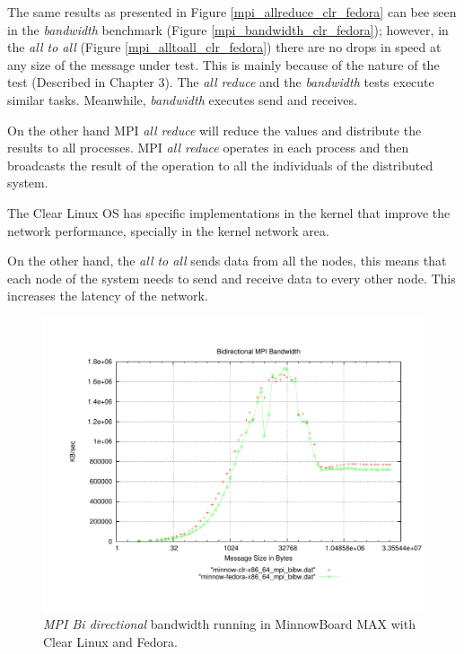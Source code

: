 The same results as presented in Figure \ref{mpi_allreduce_clr_fedora} can bee
seen in the \textit{bandwidth} benchmark (Figure
\ref{mpi_bandwidth_clr_fedora}); however, in the \textit{all to all} (Figure
\ref{mpi_alltoall_clr_fedora}) there are no drops in speed at any size of the
message under test.  This is mainly because of the nature of the test
(Described in Chapter 3). The \textit{all reduce} and the \textit{bandwidth}
tests execute similar tasks. Meanwhile, \textit{bandwidth} executes send and
receives.

On the other hand MPI \textit{all reduce} will reduce the values and distribute
the results to all processes. MPI \textit{all reduce} operates in each process
and then broadcasts the result of the operation to all the individuals of the
distributed system.

The Clear Linux OS has specific implementations in the kernel that improve the
network performance, specially in the kernel network area.

On the other hand, the \textit{all to all} sends data from all the nodes, this
means that each node of the system needs to send and receive data to every
other node. This increases the latency of the network.

\begin{figure}
  \includegraphics[width=\paperwidth]{images/mpbench_clr_experiments/mpi_bibw.pdf}
\caption{\textit{MPI Bi directional} bandwidth running in  MinnowBoard MAX with Clear Linux
and Fedora.}
\label{mpi_bibw_clr_fedora}
\end{figure}


